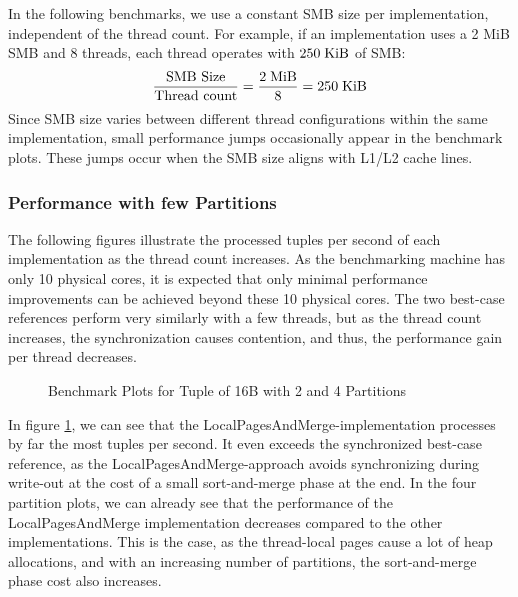 In the following benchmarks, we use a constant \ac{SMB} size per implementation, independent of the thread count.
For example, if an implementation uses a 2 MiB \ac{SMB} and 8 threads, each thread operates with $250 \textrm{\;KiB}$ of \ac{SMB}:
\begin{equation}
  \frac{\textrm{SMB Size}} {\textrm{Thread count}} = \frac{2 \textrm{\;MiB}}{8} = 250 \textrm{\;KiB}
\end{equation}
Since \ac{SMB} size varies between different thread configurations within the same implementation, small performance jumps occasionally appear in the benchmark plots.
These jumps occur when the \ac{SMB} size aligns with L1/L2 cache lines.

\subsubsection{Performance with few Partitions}
The following figures illustrate the processed tuples per second of each implementation as the thread count increases.
As the benchmarking machine has only 10 physical cores, it is expected that only minimal performance improvements can be achieved beyond these 10 physical cores.
The two best-case references perform very similarly with a few threads, but as the thread count increases, the synchronization causes contention, and thus, the performance gain per thread decreases.

\begin{figure}[h]
  \centering
  \begin{subfigure}{.49\textwidth}
    \centering
    \resizebox{\linewidth}{!}{}
  \end{subfigure}
  \begin{subfigure}{.49\textwidth}
    \centering
    \resizebox{\linewidth}{!}{}
  \end{subfigure}
  \begin{subfigure}{\textwidth}
    \centering
    \resizebox{\linewidth}{!}{}
  \end{subfigure}
  \caption[Shuffle Benchmark Plots for Tuple of 16B with 2 and 4 Partitions]{Benchmark Plots for Tuple of 16B with 2 and 4 Partitions}
  \label{plot-shuffle-16B-2-4}
\end{figure}
In figure \ref{plot-shuffle-16B-2-4}, we can see that the LocalPagesAndMerge-implementation processes by far the most tuples per second.
It even exceeds the synchronized best-case reference, as the LocalPagesAndMerge-approach avoids synchronizing during write-out at the cost of a small sort-and-merge phase at the end.
In the four partition plots, we can already see that the performance of the LocalPagesAndMerge implementation decreases compared to the other implementations.
This is the case, as the thread-local pages cause a lot of heap allocations, and with an increasing number of partitions, the sort-and-merge phase cost also increases.

